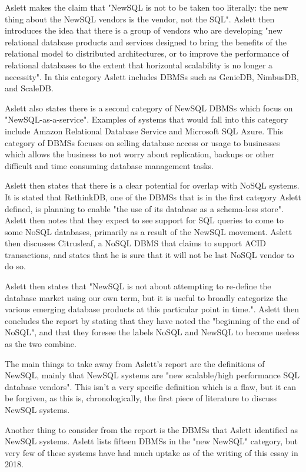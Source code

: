 \documentclass[10pt, conference]{IEEEtran}
\begin{document}
Aslett makes the claim that "NewSQL is not to be taken too literally: the new thing about the NewSQL vendors is the vendor, not the SQL". Aslett then introduces the idea that there is a group of vendors who are developing "new relational database products and services designed to bring the benefits of the relational model to distributed architectures, or to improve the performance of relational databases to the extent that horizontal scalability is no longer a necessity". In this category Aslett includes DBMSs such as GenieDB, NimbusDB, and ScaleDB.

Aslett also states there is a second category of NewSQL DBMSs which focus on "NewSQL-as-a-service". Examples of systems that would fall into this category include Amazon Relational Database Service and Microsoft SQL Azure. This category of DBMSs focuses on selling database access or usage to businesses which allows the business to not worry about replication, backups or other difficult and time consuming database management tasks.

Aslett then states that there is a clear potential for overlap with NoSQL systems. It is stated that RethinkDB, one of the DBMSs that is in the first category Aslett defined, is planning to enable "the use of its database as a schema-less store". Aslett then notes that they expect to see support for SQL queries to come to some NoSQL databases, primarily as a result of the NewSQL movement. Aslett then discusses Citrusleaf, a NoSQL DBMS that claims to support ACID transactions, and states that he is sure that it will not be last NoSQL vendor to do so.

Aslett then states that "NewSQL is not about attempting to re-define the database market using our own term, but it is useful to broadly categorize the various emerging database products at this particular point in time.". Aslett then concludes the report by stating that they have noted the "beginning of the end of NoSQL", and that they foresee the labels NoSQL and NewSQL to become useless as the two combine.

The main things to take away from Aslett's report are the definitions of NewSQL, mainly that NewSQL systems are "new scalable/high performance SQL database vendors". This isn't a very specific definition which is a flaw, but it can be forgiven, as this is, chronologically, the first piece of literature to discuss NewSQL systems.

Another thing to consider from the report is the DBMSs that Aslett identified as NewSQL systems. Aslett lists fifteen DBMSs in the "new NewSQL" category, but very few of these systems have had much uptake as of the writing of this essay in 2018.
\end{document}
